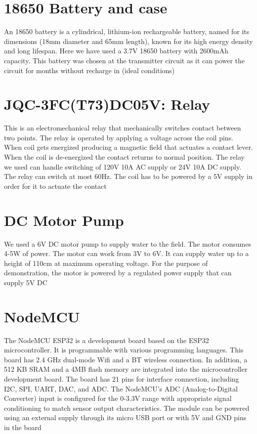 \section{18650 Battery and case}


An 18650 battery is a cylindrical, lithium-ion rechargeable battery,
named for its dimensions (18mm diameter and 65mm length), known for
its high energy density and long lifespan. Here we have used a 3.7V
18650 battery with 2600mAh capacity. This battery was chosen at the
transmitter circuit as it can power the circuit for months without
recharge in (ideal conditions)

\vspace*{1cm}

\section{JQC-3FC(T73)DC05V: Relay}

\setlength{\columnsep}{.3cm}

This is an electromechanical relay that mechanically switches contact
between two points. The relay is operated by applying a voltage
across the coil pins. When coil gets energized producing a magnetic
field that actuates a contact lever. When the coil is de-energized
the contact returns to normal position. The relay we used can handle
switching of 120V 10A AC supply or 24V 10A DC supply. The relay can
switch at most 60Hz. The coil has to be powered by a 5V supply in
order for it to actuate the contact

\section{DC Motor Pump}


We used a 6V DC motor pump to supply water to the field. The motor
consumes 4-5W of power. The motor can work from 3V to 6V. It can
supply water up to a height of 110cm at maximum operating voltage.
For the purpose of demonstration, the motor is powered by a regulated
power supply that can supply 5V DC

\vspace*{1cm}

\section{NodeMCU}
The NodeMCU ESP32 is a development board based on the ESP32
microcontroller. It is programmable with various programming
languages. This board has 2.4 GHz dual-mode Wifi and a BT wireless
connection. In addition, a 512 KB SRAM and a 4MB flash memory are
integrated into the microcontroller development board. The board has
21 pins for interface connection, including I2C, SPI, UART, DAC, and
ADC. The NodeMCU's ADC (Analog-to-Digital Converter) input is
configured for the 0-3.3V range with appropriate signal conditioning
to match sensor output characteristics.  The module can be powered
using an external supply through its micro USB port or with 5V and
GND pins in the board
